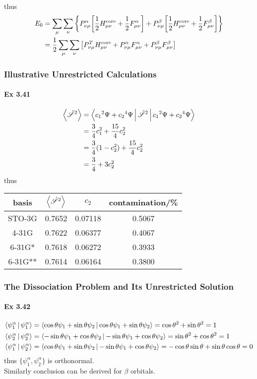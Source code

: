 \documentclass[a4paper]{article}
\newcommand{\hsS}{\hat{\mathscr{S}}}
\DeclareMathOperator{\core}{\mathrm{core}}
\newcommand{\ex}[1]{\paragraph{Ex #1}}
\numberwithin{equation}{subsection}
\begin{document}
thus
\begin{align}
E_0 &= \sum_\mu\sum_\nu \qty{P^\alpha_{\nu\mu} \qty[\dfrac{1}{2} H^{\core}_{\mu\nu} + \dfrac{1}{2} F^\alpha_{\mu\nu} ]  
+ P^\beta_{\nu\mu} \qty[\dfrac{1}{2} H^{\core}_{\mu\nu} + \dfrac{1}{2} F^\beta_{\mu\nu} ]} \notag\\
&= \dfrac{1}{2} \sum_\mu\sum_\nu \qty[P^T_{\nu\mu} H^{\core}_{\mu\nu} + P^\alpha_{\nu\mu}F^\alpha_{\mu\nu}  + P^\beta_{\nu\mu}F^\beta_{\mu\nu} ]
\end{align}

\subsubsection{Illustrative Unrestricted Calculations}
\ex{3.41}
\begin{align}
\ev{\hsS^2} &= \Braket{c_1 {^2\Psi} + c_2 {^4\Psi} | \hsS^2 | c_1 {^2\Psi} + c_2 {^4\Psi}} \notag\\
&= \dfrac{3}{4}c_1^2 + \dfrac{15}{4}c_2^2 \notag\\
&= \dfrac{3}{4}(1 - c_2^2) + \dfrac{15}{4}c_2^2 \notag\\
&= \dfrac{3}{4} + 3c_2^2
\end{align}
thus
\linespread{1.2}
\begin{table}[H]
	\centering
	\begin{tabular}{cccc}
		\hline
		basis & $ \ev{\hsS^2} $ & $ c_2 $ & contamination/\% \\ \hline		
		STO-3G & 0.7652 & 0.07118 & 0.5067\\
		4-31G  & 0.7622 & 0.06377 & 0.4067\\
		6-31G* & 0.7618 & 0.06272 & 0.3933\\
		6-31G**& 0.7614 & 0.06164 & 0.3800\\
		\hline
	\end{tabular}
\end{table}
\linespread{1.0}

\subsubsection{The Dissociation Problem and Its Unrestricted Solution}
\ex{3.42}
\begin{align}
\Braket{\psi_1^\alpha|\psi_1^\alpha} &= \Braket{\cos\theta\psi_1 + \sin\theta\psi_2 | \cos\theta\psi_1 + \sin\theta\psi_2} = \cos\theta^2 + \sin\theta^2 = 1 \\
\Braket{\psi_2^\alpha|\psi_2^\alpha} &= \Braket{-\sin\theta\psi_1 + \cos\theta\psi_2 | -\sin\theta\psi_1 + \cos\theta\psi_2} = \sin\theta^2 + \cos\theta^2 = 1 \\
\Braket{\psi_1^\alpha|\psi_2^\alpha} &= \Braket{\cos\theta\psi_1 + \sin\theta\psi_2 | -\sin\theta\psi_1 + \cos\theta\psi_2} = -\cos\theta\sin\theta + \sin\theta\cos\theta = 0
\end{align}
thus $ \{\psi_1^\alpha, \psi_2^\alpha\} $ is orthonormal.\\
Similarly conclusion can be derived for $ \beta $ orbitals.
\end{document}
